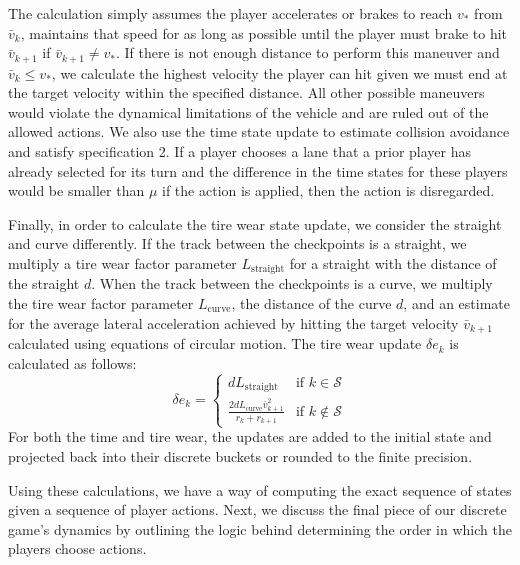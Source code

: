 The calculation simply assumes the player accelerates or brakes to reach $v_*$ from $\bar{v}_k$, maintains that speed for as long as possible until the player must brake to hit $\bar{v}_{k+1}$ if $\bar{v}_{k+1} \neq v_*$. If there is not enough distance to perform this maneuver and $\bar{v}_k \leq v_*$, we calculate the highest velocity the player can hit given we must end at the target velocity within the specified distance. All other possible maneuvers would violate the dynamical limitations of the vehicle and are ruled out of the allowed actions. We also use the time state update to estimate collision avoidance and satisfy specification 2. If a player chooses a lane that a prior player has already selected for its turn and the difference in the time states for these players would be smaller than $\mu$ if the action is applied, then the action is disregarded.

Finally, in order to calculate the tire wear state update, we consider the straight and curve differently. If the track between the checkpoints is a straight, we multiply a tire wear factor parameter $L_{\text{straight}}$ for a straight with the distance of the straight $d$. When the track between the checkpoints is a curve, we multiply the tire wear factor parameter $L_{\text{curve}}$, the distance of the curve $d$, and an estimate for the average lateral acceleration achieved by hitting the target velocity $\bar{v}_{k+1}$ calculated using equations of circular motion. The tire wear update $\delta e_k$ is calculated as follows:
\begin{equation}
\delta e_k = \begin{cases}
    dL_{\text{straight}} & \text{if } k \in \mathcal{S} \\
    \frac{2dL_{\text{curve}}\bar{v}_{k+1}^2}{r_k + r_{k+1}} & \text{if } k \notin \mathcal{S}
\end{cases}
\end{equation}
For both the time and tire wear, the updates are added to the initial state and projected back into their discrete buckets or rounded to the finite precision.

Using these calculations, we have a way of computing the exact sequence of states given a sequence of player actions. Next, we discuss the final piece of our discrete game's dynamics by outlining the logic behind determining the order in which the players choose actions. 

